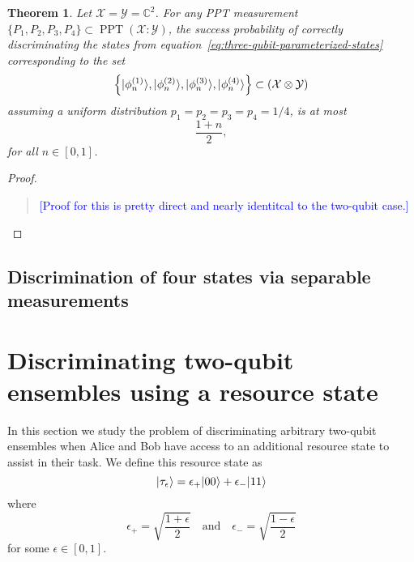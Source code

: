 \documentclass[11pt]{article}
\newtheorem{theorem}{Theorem}
\theoremstyle{definition}
\newcommand{\comment}[1]{\begin{quote}\sf 
    \textcolor{blue}{[#1]}\end{quote}}
\newcommand{\microspace}{\mspace{0.5mu}}
\newcommand{\ppt}{\operatorname{PPT}}
\newcommand{\ket}[1]{
  \lvert\microspace #1 \microspace \rangle}
\newcommand{\complex}{\mathbb{C}}
\newcommand{\X}{\mathcal{X}}
\newcommand{\Y}{\mathcal{Y}}
\begin{document}
\begin{theorem}
    Let $\X = \Y = \complex^2$. For any PPT measurement $\{ P_1, P_2, P_3, P_4
    \} \subset \ppt(\X : \Y)$, the success probability of correctly
    discriminating the states from
    equation~\eqref{eq:three-qubit-parameterized-states} corresponding to the
    set 
	\begin{equation}
        \left\{ 
            \ket{\phi_n^{(1)}},
            \ket{\phi_n^{(2)}},
            \ket{\phi_n^{(3)}},
            \ket{\phi_n^{(4)}} 
        \right\} \subset 
        \left(\X \otimes \Y \right)
	\end{equation}
    assuming a uniform distribution $p_1 = p_2 = p_3 = p_4 = 1/4$, is at most
    \begin{equation}
        \frac{1 + n}{2},
    \end{equation}
    for all $n \in [0, 1]$.
\end{theorem}
\begin{proof}
    \comment{Proof for this is pretty direct and nearly identitcal to the
    two-qubit case.}
\end{proof}

\subsection*{Discrimination of four states via separable measurements}
\label{sec:discrim-three-qubit-four-states-sep-resource}




\section{Discriminating two-qubit ensembles using a resource state}
\label{sec:ent-cost-resource-state}

In this section we study the problem of discriminating arbitrary two-qubit
ensembles when Alice and Bob have access to an additional resource state to
assist in their task. We define this resource state as
\begin{equation}
    \ket{\tau_{\epsilon}} = \epsilon_+ \ket{00} + \epsilon_- \ket{11}
\end{equation}
where
\begin{equation}
    \epsilon_+ = \sqrt{\frac{1+\epsilon}{2}}
    \quad \text{and} \quad 
    \epsilon_- = \sqrt{\frac{1-\epsilon}{2}}
\end{equation}
for some $\epsilon \in [0,1]$. 
\end{document}
